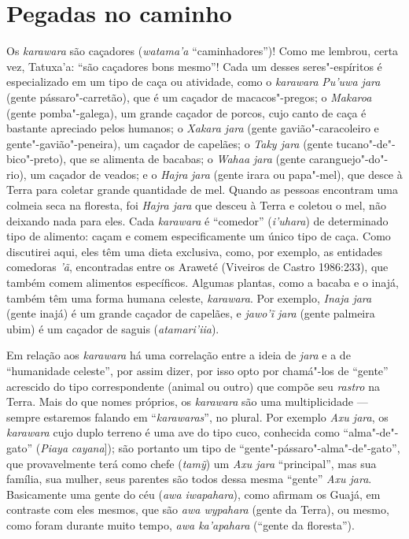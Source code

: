 \section{Pegadas no caminho}\label{pegadas-no-caminho}

Os \emph{karawara} são caçadores (\emph{watama'a} ``caminhadores'')!
Como me lembrou, certa vez, Tatuxa'a: ``são caçadores bons mesmo''! Cada
um desses seres"-espíritos é especializado em um tipo de caça ou
atividade, como o \emph{karawara} \emph{Pu'uwa jara} (gente
pássaro"-carretão), que é um caçador de macacos"-pregos; o \emph{Makaroa}
(gente pomba"-galega), um grande caçador de porcos, cujo canto de caça é
bastante apreciado pelos humanos; o \emph{Xakara jara} (gente
gavião"-caracoleiro e gente"-gavião"-peneira), um caçador de capelães; o
\emph{Taky jara} (gente tucano"-de"-bico"-preto), que se alimenta de
bacabas; o \emph{Wahaa jara} (gente caranguejo"-do"-rio), um caçador de
veados; e o \emph{Hajra} \emph{jara} (gente irara ou papa"-mel), que
desce à Terra para coletar grande quantidade de mel. Quando as pessoas
encontram uma colmeia seca na floresta, foi \emph{Hajra jara} que desceu
à Terra e coletou o mel, não deixando nada para eles. Cada
\emph{karawara} é ``comedor'' (\emph{i'uhara}) de determinado tipo de
alimento: caçam e comem especificamente um único tipo de caça. Como
discutirei aqui, eles têm uma dieta exclusiva, como, por exemplo, as
entidades comedoras \emph{'ã}, encontradas entre os Araweté (Viveiros de
Castro 1986:233), que também comem alimentos específicos. Algumas
plantas, como a bacaba e o inajá, também têm uma forma humana celeste,
\emph{karawara}. Por exemplo, \emph{Inaja jara} (gente inajá) é um
grande caçador de capelães, e \emph{jawo'ĩ jara} (gente palmeira ubim) é
um caçador de saguis (\emph{atamari'iia}).

Em relação aos \emph{karawara} há uma correlação entre a ideia de
\emph{jara} e a de ``humanidade celeste'', por assim dizer, por isso opto
por chamá"-los de ``gente'' acrescido do tipo correspondente (animal ou
outro) que compõe seu \emph{rastro} na Terra. Mais do que nomes
próprios, os \emph{karawara} são uma multiplicidade --- sempre estaremos
falando em ``\emph{karawaras}'', no plural. Por exemplo \emph{Axu jara},
os \emph{karawara} cujo duplo terreno é uma ave do tipo cuco, conhecida
como ``alma"-de"-gato'' (\emph{Piaya} \emph{cayana}{]}); são portanto um
tipo de ``gente"-pássaro"-alma"-de"-gato'', que provavelmente terá como
chefe (\emph{tamỹ}) um \emph{Axu jara} ``principal'', mas sua família,
sua mulher, seus parentes são todos dessa mesma ``gente'' \emph{Axu
jara}. Basicamente uma gente do céu (\emph{awa iwapahara}), como afirmam
os Guajá, em contraste com eles mesmos, que são \emph{awa wypahara}
(gente da Terra), ou mesmo, como foram durante muito tempo, \emph{awa
ka'apahara} (``gente da floresta'').

